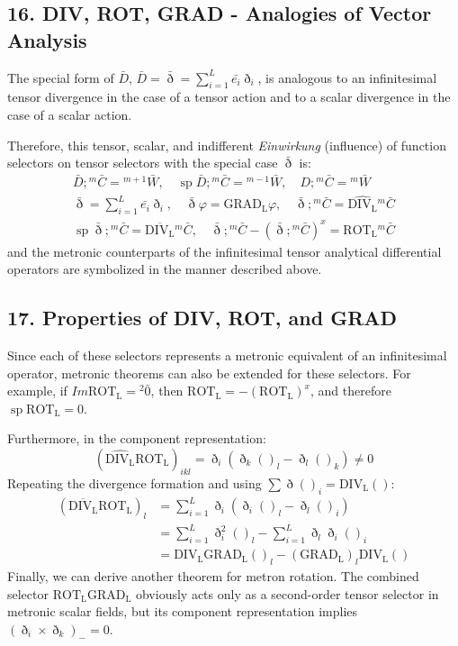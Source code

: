 \documentclass[11pt,a4paper,oneside]{article}
\DeclareMathOperator{\spn}{sp}
\newcommand{\ethop}{\eth}
\begin{document}
\subsection{16. DIV, ROT, GRAD - Analogies of Vector Analysis}
The special form of $\bar{D}$, $\bar{D} = \bar {\ethop} = \sum_{i = 1}^L \bar {e_i}\ethop_i$, is analogous to an infinitesimal tensor divergence in the case of a tensor action and to a scalar divergence in the case of a scalar action.

Therefore, this tensor, scalar, and indifferent \textit{Einwirkung} (influence) of function selectors on tensor selectors with the special case $\bar {\ethop}$ is:
\begin{equation}
    \begin{gathered}
    \bar {D}; {}^m \bar {C} = {}^{m + 1 } \bar {W},\quad \spn \bar {D}; {}^m \bar {C} = {}^{m-1} \bar {W},\quad D; {}^m \bar {C} = {}^m \bar {W} \\
    \bar {\ethop} = \sum_{i = 1}^L \bar {e_i}\ethop_i,\quad \bar {\ethop} \varphi = \mathrm{GRAD_L} \varphi,\quad \bar {\ethop}; {}^m \bar {C} = \widehat{\mathrm{DIV_L}} {}^m \bar {C} \\
    \spn \bar {\ethop}; {}^m \bar{C} = \overline{\mathrm{DIV_L}} {}^m \bar {C},\quad\bar{\ethop}; {}^m \bar {C}-(\bar{\ethop}; {}^m \bar {C})^x = \mathrm{ROT_L} {}^m \bar {C} 
    \end{gathered} \tag {M12b}
\end{equation}
and the metronic counterparts of the infinitesimal tensor analytical differential operators are symbolized in the manner described above.

\subsection{17. Properties of DIV, ROT, and GRAD}
Since each of these selectors represents a metronic equivalent of an infinitesimal operator, metronic theorems can also be extended for these selectors. For example, if $Im\mathrm{ROT_L} = {}^2 \bar {0}$, then $\mathrm{ROT_L} = -(\mathrm{ROT_L})^x$, and therefore $\spn\mathrm{ROT_L} = 0$.

Furthermore, in the component representation:
\begin{equation*}
    (\widehat{\mathrm{DIV_L}} \mathrm{ROT_L})_{ikl} = \ethop_i(\ethop_k()_l-\ethop_l()_k) \neq 0
\end{equation*}
Repeating the divergence formation and using $\sum \ethop()_i = \mathrm{DIV_L}()$:
\begin{align*}
    (\overline {\mathrm{DIV_L}}\mathrm{ROT_L})_l &= \sum_{i = 1}^L\ethop_i(\ethop_i()_l-\ethop_l()_i) \\
    &= \sum_{i = 1}^L\ethop_i^2()_l- \sum_{i = 1}^L\ethop_l\ethop_i()_i \\
    &= \mathrm{DIV_L} \mathrm{GRAD_L}()_l-(\mathrm{GRAD_L})_l\mathrm{DIV_L}()
\end{align*}
Finally, we can derive another theorem for metron rotation. The combined selector $\mathrm{ROT_L}\mathrm{GRAD_L}$ obviously acts only as a second-order tensor selector in metronic scalar fields, but its component representation implies $(\ethop_i\times\ethop_k)_- = 0$.
\end{document}
